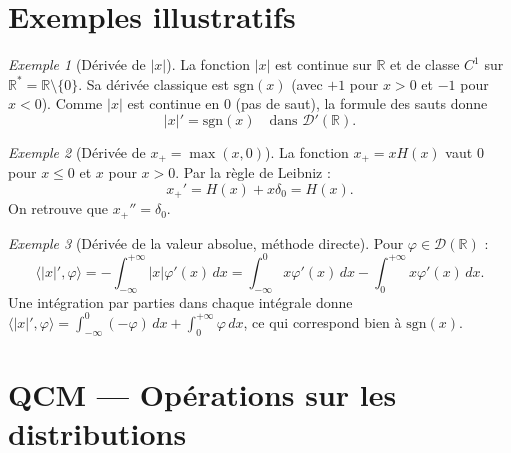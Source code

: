 \documentclass[12pt,a4paper,openany]{book}
\theoremstyle{definition}
\theoremstyle{plain}
\theoremstyle{remark}
\newtheorem*{example}{Exemple}
\newenvironment{exemple}{\begin{example}}{\end{example}}
\begin{document}
	\section{Exemples illustratifs}
	
	\begin{exemple}[Dérivée de $|x|$]
		La fonction $|x|$ est continue sur $\mathbb{R}$ et de classe $C^1$ sur $\mathbb{R}^* = \mathbb{R} \setminus \{0\}$. Sa dérivée classique est $\mathrm{sgn}(x)$ (avec $+1$ pour $x>0$ et $-1$ pour $x<0$). Comme $|x|$ est continue en $0$ (pas de saut), la formule des sauts donne
		\[
		|x|' = \mathrm{sgn}(x) \quad \text{dans } \mathcal{D}'(\mathbb{R}).
		\]
	\end{exemple}
	
	\begin{exemple}[Dérivée de $x_+ = \max(x,0)$]
		La fonction $x_+ = xH(x)$ vaut $0$ pour $x \leq 0$ et $x$ pour $x > 0$. Par la règle de Leibniz :
		\[
		x_+' = H(x) + x\delta_0 = H(x).
		\]
		On retrouve que $x_+'' = \delta_0$.
	\end{exemple}
	
	\begin{exemple}[Dérivée de la valeur absolue, méthode directe]
		Pour $\varphi \in \mathcal{D}(\mathbb{R})$ :
		\[
		\langle |x|', \varphi \rangle = -\int_{-\infty}^{+\infty} |x| \varphi'(x)\,dx = \int_{-\infty}^0 x\varphi'(x)\,dx - \int_0^{+\infty} x\varphi'(x)\,dx.
		\]
		Une intégration par parties dans chaque intégrale donne $\langle |x|', \varphi \rangle = \int_{-\infty}^0 (-\varphi)\,dx + \int_0^{+\infty} \varphi\,dx$, ce qui correspond bien à $\mathrm{sgn}(x)$.
	\end{exemple}
	
	\section{QCM — Opérations sur les distributions}
	
\end{document}
